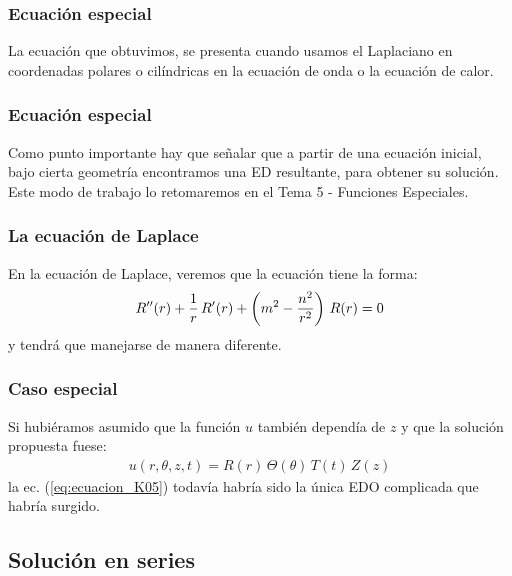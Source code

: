 \documentclass[12pt]{beamer}
\begin{document}
\begin{frame}
\frametitle{Ecuación especial}
La ecuación que obtuvimos, se presenta cuando usamos el Laplaciano en coordenadas polares o cilíndricas en la ecuación de onda o la ecuación de calor.
\end{frame}
\begin{frame}
\frametitle{Ecuación especial}
Como punto importante hay que señalar que a partir de una ecuación inicial, bajo cierta geometría encontramos una ED resultante, para obtener su solución. Este modo de trabajo lo retomaremos en el Tema 5 - Funciones Especiales.
\end{frame}
\begin{frame}
\frametitle{La ecuación de Laplace}
En la ecuación de Laplace, veremos que la ecuación tiene la forma:
\pause
\begin{align*}
{R}^{\prime \prime} (r) + \dfrac{1}{r} \, {R}^{\prime} (r) + \left( m^{2} - \dfrac{n^{2}}{r^{2}} \right) \, R(r) = 0
\end{align*}
y tendrá que manejarse de manera diferente.
\end{frame}
\begin{frame}
\frametitle{Caso especial}
Si hubiéramos asumido que la función $u$ también dependía de $z$ y que la solución propuesta fuese:
\pause
\begin{align*}
u(r, \theta, z, t) =  R(r) \, \Theta (\theta) \, T(t) \, Z(z)
\end{align*}
la ec. (\ref{eq:ecuacion_K05}) todavía habría sido la única EDO complicada que habría surgido.
\end{frame}

\subsection{Solución en series}
\end{document}
